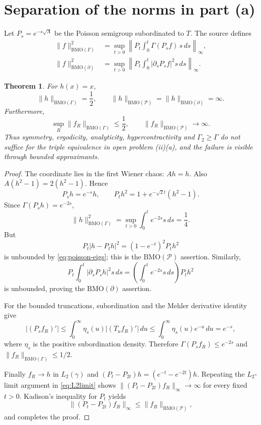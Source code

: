 \documentclass[11pt]{article}
\newtheorem{theorem}{Theorem}
\newcommand{\g}{\gamma}
\newcommand{\Pp}{\mathcal P}
\newcommand{\BMO}{\mathrm{BMO}}
\newcommand{\Ga}{\Gamma}
\begin{document}
\section{Separation of the norms in part (a)}

Let $P_s=e^{-s\sqrt A}$ be the Poisson semigroup subordinated to $T$.  The
source defines
\begin{align*}
 \|f\|_{\BMO(\Ga)}^2
 &=\sup_{t>0}\left\|P_t\int_0^t\Ga(P_sf)\,s\,ds\right\|_\infty,\\
 \|f\|_{\BMO(\partial)}^2
 &=\sup_{t>0}\left\|P_t\int_0^t|\partial_sP_sf|^2s\,ds\right\|_\infty.
\end{align*}

\begin{theorem}\label{thm:poisson}
For $h(x)=x$,
\[
 \|h\|_{\BMO(\Ga)}=\frac12,
 \qquad
 \|h\|_{\BMO(\Pp)}=\|h\|_{\BMO(\partial)}=\infty.
\]
Furthermore,
\[
 \sup_R\|f_R\|_{\BMO(\Ga)}\leq\frac12,
 \qquad
 \|f_R\|_{\BMO(\Pp)}\longrightarrow\infty.
\]
Thus symmetry, ergodicity, analyticity, hypercontractivity and
$\Ga_2\geq\Ga$ do not suffice for the triple equivalence in open problem
(ii)(a), and the failure is visible through bounded approximants.
\end{theorem}

\begin{proof}
The coordinate lies in the first Wiener chaos: $Ah=h$.  Also
$A(h^2-1)=2(h^2-1)$.  Hence
\begin{equation}\label{eq:poisson-eigs}
 P_sh=e^{-s}h,
 \qquad
 P_th^2=1+e^{-\sqrt2t}(h^2-1).
\end{equation}
Since $\Ga(P_sh)=e^{-2s}$,
\[
 \|h\|_{\BMO(\Ga)}^2
 =\sup_{t>0}\int_0^t e^{-2s}s\,ds=\frac14.
\]
But
\[
 P_t|h-P_th|^2=(1-e^{-t})^2P_th^2
\]
is unbounded by \eqref{eq:poisson-eigs}; this is the $\BMO(\Pp)$ assertion.
Similarly,
\[
 P_t\int_0^t|\partial_sP_sh|^2s\,ds
 =\left(\int_0^t e^{-2s}s\,ds\right)P_th^2
\]
is unbounded, proving the $\BMO(\partial)$ assertion.

For the bounded truncations, subordination and the Mehler derivative identity
give
\[
 |(P_sf_R)'|
 \leq\int_0^\infty\eta_s(u)|(T_uf_R)'|\,du
 \leq\int_0^\infty\eta_s(u)e^{-u}\,du=e^{-s},
\]
where $\eta_s$ is the positive subordination density.  Therefore
$\Ga(P_sf_R)\leq e^{-2s}$ and
$\|f_R\|_{\BMO(\Ga)}\leq1/2$.

Finally $f_R\to h$ in $L_2(\g)$ and
$(P_t-P_{2t})h=(e^{-t}-e^{-2t})h$.  Repeating the $L_2$-limit argument in
\eqref{eq:L2limit} shows
$\|(P_t-P_{2t})f_R\|_\infty\to\infty$ for every fixed $t>0$.  Kadison's
inequality for $P_t$ yields
\[
 \|(P_t-P_{2t})f_R\|_\infty\leq\|f_R\|_{\BMO(\Pp)},
\]
and completes the proof.
\end{proof}
\end{document}
